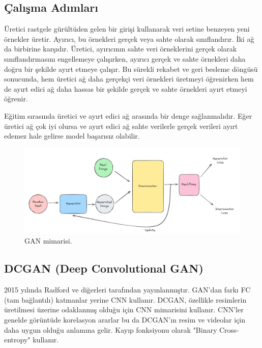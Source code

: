 \subsection{Çalışma Adımları}
Üretici rastgele gürültüden gelen bir girişi kullanarak veri setine benzeyen yeni örnekler üretir. Ayırıcı, bu örnekleri gerçek veya sahte olarak sınıflandırır. İki ağ da birbirine karşıdır. Üretici, ayırıcının sahte veri örneklerini gerçek olarak sınıflandırmasını engellemeye çalışırken, ayırıcı gerçek ve sahte örnekleri daha doğru bir şekilde ayırt etmeye çalışır. Bu sürekli rekabet ve geri besleme döngüsü sonucunda, hem üretici ağ daha gerçekçi veri örnekleri üretmeyi öğrenirken hem de ayırt edici ağ daha hassas bir şekilde gerçek ve sahte örnekleri ayırt etmeyi öğrenir.

Eğitim sırasında üretici ve ayırt edici ağ arasında bir denge sağlanmalıdır. Eğer üretici ağ çok iyi olursa ve ayırt edici ağ sahte verilerle gerçek verileri ayırt edemez hale gelirse model başarısız olabilir. 

\begin{figure}[h]
    \centering
    \includegraphics[width=1\textwidth]{images/gan_architecture.png}
    \caption{GAN mimarisi.}
    \label{fig:enter-label}
\end{figure}

\subsection{DCGAN (Deep Convolutional GAN)}
2015 yılında Radford ve diğerleri tarafından yayınlanmıştır. GAN'dan farkı FC (tam bağlantılı) katmanlar yerine CNN kullanır. DCGAN, özellikle resimlerin üretilmesi üzerine odaklanmış olduğu için CNN mimarisini kullanır. CNN'ler genelde görüntüde korelasyon ararlar bu da DCGAN'ın resim ve videolar için daha uygun olduğu anlamına gelir. Kayıp fonksiyonu olarak "Binary Cross-entropy" kullanır.


